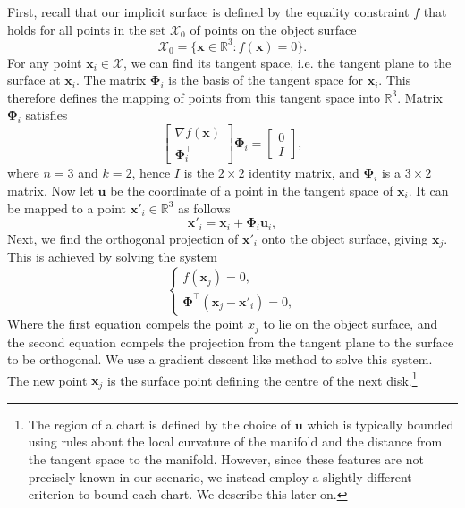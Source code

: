 First, recall that our implicit surface is defined by the equality constraint $f$ that holds for all points in the set $\mathcal{X_0}$ of points on the object surface
\begin{equation}
\mathcal{X_0} = \{\mathbf{x} \in \mathbb{R}^3 : f(\mathbf{x}) = 0 \}.
\end{equation}
For any point $\mathbf{x}_i \in \mathcal{X}$, we can find its tangent space, i.e. the tangent plane to the surface at $\mathbf{x}_i$. The matrix $\boldsymbol{\Phi}_i$ is the basis of the tangent space for $\mathbf{x}_i$. This therefore defines the mapping of points from this tangent space into $\mathbb{R}^3$.
Matrix $\boldsymbol{\Phi}_i$ satisfies
\begin{equation}
\begin{bmatrix} \nabla f(\mathbf{x}) \\ \boldsymbol{\Phi}_i^\top \end{bmatrix} \boldsymbol{\Phi}_i = \begin{bmatrix}  0 \\ I \end{bmatrix}, \label{eq:tangent_basis}
\end{equation}
where $n=3$ and $k=2$, hence $I$ is the $2\times2$ identity matrix, and $\boldsymbol{\Phi}_i$ is a $3\times2$ matrix. 
Now let $\mathbf{u}$ be the coordinate of a point in the tangent space of $\mathbf{x}_i$. It can be mapped to a point $\mathbf{x}'_i \in \mathbb{R}^3$ as follows
\begin{equation}
  \mathbf{x}'_i = \mathbf{x}_i + \boldsymbol{\Phi}_i \mathbf{u}_i, \label{eq:tangent_approx}
\end{equation}
Next, we find the orthogonal projection of $\mathbf{x}'_i$ onto the object surface, giving $\mathbf{x}_j$. This is achieved by solving the system
\begin{equation}
\begin{cases}
f(\mathbf{x}_j) = 0,
\\
\boldsymbol{\Phi}^\top( \mathbf{x}_j - \mathbf{x}'_i ) = 0,
\end{cases} \label{eq:projection}
\end{equation}
Where the first equation compels the point $x_j$ to lie on the object surface, and the second equation compels the projection from the tangent plane to the surface to be orthogonal. We use a gradient descent like method to solve this system. The new point $\mathbf{x}_j$ is the surface point defining the centre of the next disk.\footnote{The region of a chart is defined by the choice of $\mathbf{u}$ which is typically bounded using rules about the local curvature of the manifold and the distance from the tangent space to the manifold. However, since these features are not precisely known in our scenario, we instead employ a slightly different criterion to bound each chart. We describe this later on.}

